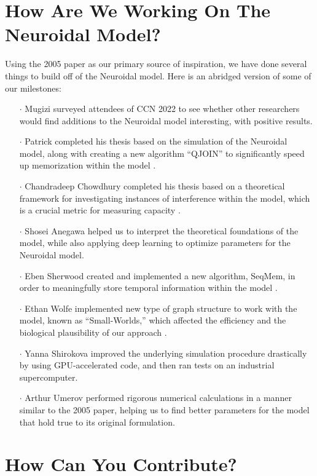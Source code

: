 \documentclass{article}
\begin{document}
\section*{How Are We Working On The Neuroidal Model?}

Using the 2005 paper as our primary source of inspiration, we have done several things to build off of the Neuroidal model. Here is an abridged version of some of our milestones:

\begin{itemize}
\item[$\cdot$]Mugizi surveyed attendees of CCN 2022 to see whether other researchers would find additions to the Neuroidal model interesting, with positive results.
\item[$\cdot$]Patrick completed his thesis based on the simulation of the Neuroidal model, along with creating a new algorithm ``QJOIN'' to significantly speed up memorization within the model \cite{perrine2023}.
\item[$\cdot$]Chandradeep Chowdhury completed his thesis based on a theoretical framework for investigating instances of interference within the model, which is a crucial metric for measuring capacity \cite{chowdhury2023}.
\item[$\cdot$]Shosei Anegawa helped us to interpret the theoretical foundations of the model, while also applying deep learning to optimize parameters for the Neuroidal model.
\item[$\cdot$]Eben Sherwood created and implemented a new algorithm, SeqMem, in order to meaningfully store temporal information within the model \cite{sherwood2024}.
\item[$\cdot$]Ethan Wolfe implemented new type of graph structure to work with the model, known as ``Small-Worlds,'' which affected the efficiency and the biological plausibility of our approach \cite{wolfe2024}.
\item[$\cdot$]Yanna Shirokova improved the underlying simulation procedure drastically by using GPU-accelerated code, and then ran tests on an industrial supercomputer.
\item[$\cdot$]Arthur Umerov performed rigorous numerical calculations in a manner similar to the 2005 paper, helping us to find better parameters for the model that hold true to its original formulation.
\end{itemize}

\newpage

\section*{How Can You Contribute?}
\end{document}
